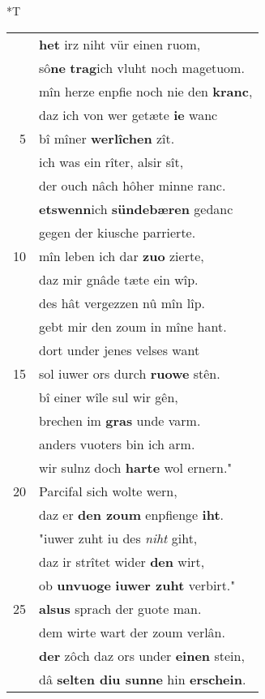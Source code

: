 \documentclass[8pt,a4paper,notitlepage]{article}
\begin{document}
\begin{table}[ht]
\begin{minipage}[t]{0.5\linewidth}
\small
\begin{center}*T
\end{center}
\begin{tabular}{rl}
 & \textbf{het} irz niht vür einen ruom,\\ 
 & sô\textbf{ne} \textbf{trag}ich vluht noch magetuom.\\ 
 & mîn herze enpfie noch nie den \textbf{kranc},\\ 
 & daz ich von wer getæte \textbf{ie} wanc\\ 
5 & bî mîner \textbf{werlîchen} zît.\\ 
 & ich was ein rîter, alsir sît,\\ 
 & der ouch nâch hôher minne ranc.\\ 
 & \textbf{etswenn}ich \textbf{sündebæren} gedanc\\ 
 & gegen der kiusche parrierte.\\ 
10 & mîn leben ich dar \textbf{zuo} zierte,\\ 
 & daz mir gnâde tæte ein wîp.\\ 
 & des hât vergezzen nû mîn lîp.\\ 
 & gebt mir den zoum in mîne hant.\\ 
 & dort under jenes velses want\\ 
15 & sol iuwer ors durch \textbf{ruowe} stên.\\ 
 & bî einer wîle sul wir gên,\\ 
 & brechen im \textbf{gras} unde varm.\\ 
 & anders vuoters bin ich arm.\\ 
 & wir sulnz doch \textbf{harte} wol ernern."\\ 
20 & Parcifal sich wolte wern,\\ 
 & daz er \textbf{den zoum} enpfienge \textbf{iht}.\\ 
 & "iuwer zuht iu des \textit{niht} giht,\\ 
 & daz ir strîtet wider \textbf{den} wirt,\\ 
 & ob \textbf{unvuoge} \textbf{iuwer zuht} verbirt."\\ 
25 & \textbf{alsus} sprach der guote man.\\ 
 & dem wirte wart der zoum verlân.\\ 
 & \textbf{der} zôch daz ors under \textbf{einen} stein,\\ 
 & dâ \textbf{selten diu sunne} hin \textbf{erschein}.\\ 

\end{tabular}
\end{minipage}
\end{table}
\end{document}

